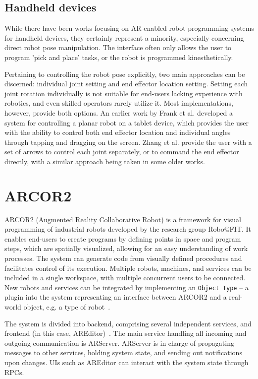 \section{Handheld devices}

While there have been works focusing on AR-enabled robot programming systems for handheld devices, they certainly represent a minority, especially concerning direct robot pose manipulation. The interface often only allows the user to program 'pick and place' tasks, or the robot is programmed kinesthetically\cite{picknplace, Tango}.

Pertaining to controlling the robot pose explicitly, two main approaches can be discerned: individual joint setting and end effector location setting. Setting each joint rotation individually is not suitable for end-users lacking experience with robotics, and even skilled operators rarely utilize it. Most implementations, however, provide both options. An earlier work by Frank et al.\cite{planar} developed a system for controlling a planar robot on a tablet device, which provides the user with the ability to control both end effector location and individual angles through tapping and dragging on the screen. Zhang et al.\cite{ZHANG20201221} provide the user with a set of arrows to control each joint separately, or to command the end effector directly, with a similar approach being taken in some older works\cite{pendant}. 



\chapter{ARCOR2}
ARCOR2 (Augmented Reality Collaborative Robot) is a framework for visual programming of industrial robots developed by the research group Robo@FIT. It enables end-users to create programs by defining points in space and program steps, which are spatially visualized, allowing for an easy understanding of work processes. The system can generate code from visually defined procedures and facilitates control of its execution. Multiple robots, machines, and services can be included in a single workspace, with multiple concurrent users to be connected. New robots and services can be integrated by implementing an \texttt{Object Type} -- a plugin into the system representing an interface between ARCOR2 and a real-world object, e.g. a type of robot~\cite{kapinus2023arcor2}.

The system is divided into backend, comprising several independent services, and frontend (in this case, AREditor)~\cite{arcor2}. The main service handling all incoming and outgoing communication is ARServer. ARServer is in charge of propagating messages to other services, holding system state, and sending out notifications upon changes. UIs such as AREditor can interact with the system state through RPCs.

